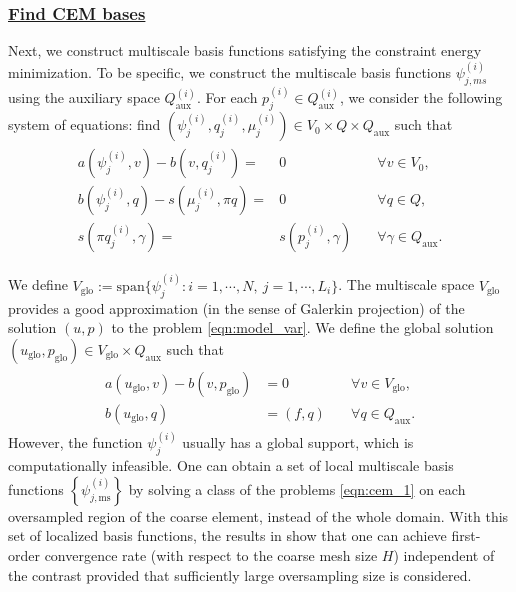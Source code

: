 \documentclass{article}[11pt]
\theoremstyle{definition}
\begin{document}
\subsubsection*{\underline{Find CEM bases}}
Next, we construct multiscale basis functions satisfying the constraint energy minimization. To be specific, we construct the multiscale basis functions $\psi_{j,{ms}}^{(i)}$ using the auxiliary space $Q_{\text{aux}}^{(i)}$. 
For each $p_j^{(i)} \in Q_{\text{aux}}^{(i)}$, we consider the following system of equations: find $(\psi_j^{(i)}, q_j^{(i)}, \mu_j^{(i)}) \in V_0 \times Q \times Q_{\text{aux}}$ such that 
\begin{eqnarray}
\begin{split}
a(\psi_j^{(i)}, v) - b(v, q_j^{(i)}) = & 0 & \quad \forall v \in V_0, \\
b(\psi_j^{(i)}, q) - s(\mu_j^{(i)},\pi q)  = & 0 & \quad \forall q \in Q, \\%
s(\pi q_j^{(i)}, \gamma)  = & s(p_j^{(i)}, \gamma) & \quad \forall \gamma \in Q_{\text{aux}}. 
\end{split}
\label{eqn:cem_1}
\end{eqnarray}

We define $V_{\text{glo}} := \text{span} \{ \psi_j^{(i)}: i = 1, \cdots, N, ~ j = 1, \cdots, L_i \}$. The multiscale space $V_{\text{glo}}$ provides a good approximation (in the sense of Galerkin projection) of the solution $(u,p)$ to the problem \eqref{eqn:model_var}. We define the global solution $(u_{\text{glo}}, p_{\text{glo}}) \in V_{\text{glo}} \times Q_{\text{aux}}$ such that 
\begin{eqnarray}\label{eqn:glo_sol}
\begin{split}
a(u_{\text{glo}}, v) - b(v, p_{\text{glo}}) &=  0 & \quad \forall v \in V_{\text{glo}}, \\
b(u_{\text{glo}}, q) & = (f,q) & \quad \forall q \in Q_{\text{aux}}. 
\end{split}
\end{eqnarray}
However, the function $\psi_j^{(i)}$ usually has a global support, which is computationally infeasible. One can obtain a set of local multiscale basis functions $\left \{ \psi_{j, \text{ms}}^{(i)} \right \}$ by solving a class of the problems \eqref{eqn:cem_1} on each oversampled region of the coarse element, instead of the whole domain. With this set of localized basis functions, the results in \cite{chung2018constraintmixed} show that one can achieve first-order convergence rate (with respect to the coarse mesh size $H$) independent of the contrast provided that sufficiently large oversampling size is considered. 
\end{document}
